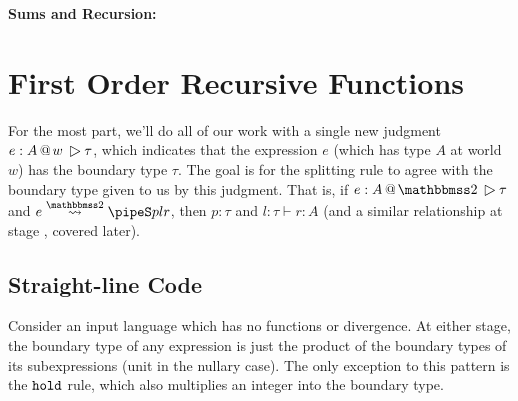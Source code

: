 \documentclass[]{article}
\begin{document}
\begin{abstrsyn}
\begin{framed}
\noindent\textbf{Sums and Recursion:}
\end{framed}


\section{First Order Recursive Functions}
\label{sec:firstorder}

For the most part, we'll do all of our work with a single new judgment \mbox{$\btj e A w \tau$}, 
which indicates that the expression $e$ (which has type $A$ at world $w$) has the boundary type $\tau$.
The goal is for the splitting rule to agree with the boundary type given to us by this judgment.
That is, if $\btj e A \bbtwo \tau$ and $\splittwo{e}{A}{p}{l}{r}$, 
then $p:\tau$ and $l:\tau \vdash r:A$ (and a similar relationship at stage \bbone, covered later).

\subsection{Straight-line Code}

Consider an input language which has no functions or divergence.
At either stage, the boundary type of any expression is 
just the product of the boundary types of its subexpressions
(unit in the nullary case).
The only exception to this pattern is the ${\tt hold}$ rule,
which also multiplies an integer into the boundary type.


\end{abstrsyn}
\end{document}
